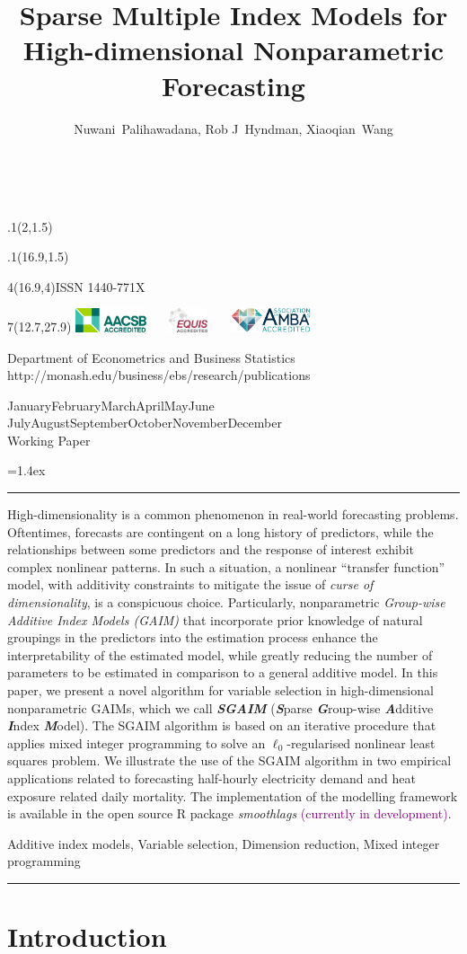 \documentclass[11pt,a4paper,]{article}
\title{Sparse Multiple Index Models for High-dimensional Nonparametric
Forecasting}
\author{Nuwani~Palihawadana, Rob J~Hyndman, Xiaoqian~Wang}
\date{\sf\Date~\Month~\Year}
\makeatletter
\def\Date{\number\day}
\def\Month{\ifcase\month\or
 January\or February\or March\or April\or May\or June\or
 July\or August\or September\or October\or November\or December\fi}
\def\Year{\number\year}
\def\showjel{{\large\textsf{\textbf{JEL classification:}}~\@jel}}
\def\cover{{\sffamily\setcounter{page}{0}
        \thispagestyle{empty}
        \placefig{2}{1.5}{width=5cm}{_extensions/numbats/wp/monash2}
        \placefig{16.9}{1.5}{width=2.1cm}{_extensions/numbats/wp/MBSportrait}
        \begin{textblock}{4}(16.9,4)ISSN 1440-771X\end{textblock}
        \begin{textblock}{7}(12.7,27.9)\hfill
        \includegraphics[height=0.7cm]{_extensions/numbats/wp/AACSB}~~~
        \includegraphics[height=0.7cm]{_extensions/numbats/wp/EQUIS}~~~
        \includegraphics[height=0.7cm]{_extensions/numbats/wp/AMBA}
        \end{textblock}
        \vspace*{2cm}
        \begin{center}\Large
        Department of Econometrics and Business Statistics\\[.5cm]
        \footnotesize http://monash.edu/business/ebs/research/publications
        \end{center}\vspace{2cm}
        \begin{center}
        \fbox{\parbox{14cm}{\begin{onehalfspace}\centering\Huge\vspace*{0.3cm}
                \textsf{\textbf{\expandafter{\@title}}}\vspace{1cm}\par
                \LARGE\@author\end{onehalfspace}
        }}
        \end{center}
        \vfill
                \begin{center}\Large
                \Month~\Year\\[1cm]
                Working Paper \@wp
        \end{center}\vspace*{2cm}}}
\def\pageone{{\sffamily\setstretch{1}%
        \thispagestyle{empty}%
        \vbox to \textheight{%
        \raggedright\baselineskip=1.2cm
     {\fontsize{24.88}{30}\sffamily\textbf{\expandafter{\@title}}}
        \vspace{2cm}\par
        \hspace{1cm}\parbox{14cm}{\sffamily\large\@addresses}\vspace{1cm}\vfill
        \hspace{1cm}{\large\Date~\Month~\Year}\\[1cm]
        \hspace{1cm}\showjel\vss}}}
\def\blindtitle{{\sffamily
     \thispagestyle{plain}\raggedright\baselineskip=1.2cm
     {\fontsize{24.88}{30}\sffamily\textbf{\expandafter{\@title}}}\vspace{1cm}\par
        }}
\def\titlepage{{\cover\newpage\pageone\newpage\blindtitle}}
\let\maketitle\titlepage
\newenvironment{keywords}{\par\vspace{0.5cm}\noindent{\sffamily\textbf{Keywords:}}}{\vspace{0.25cm}\par\hrule\vspace{0.5cm}\par}
\renewenvironment{abstract}{\begin{minipage}{\textwidth}\parskip=1.4ex\noindent
\hrule\vspace{0.1cm}\par{\sffamily\textbf{\abstractname}}\newline}
  {\end{minipage}}
\def\placefig#1#2#3#4{\begin{textblock}{.1}(#1,#2)\rlap{\texttt{[image: \#4]}}\end{textblock}}
\makeatother
\begin{document}
\maketitle
\begin{abstract}
High-dimensionality is a common phenomenon in real-world forecasting
problems. Oftentimes, forecasts are contingent on a long history of
predictors, while the relationships between some predictors and the
response of interest exhibit complex nonlinear patterns. In such a
situation, a nonlinear ``transfer function'' model, with additivity
constraints to mitigate the issue of \emph{curse of dimensionality}, is
a conspicuous choice. Particularly, nonparametric \emph{Group-wise
Additive Index Models (GAIM)} that incorporate prior knowledge of
natural groupings in the predictors into the estimation process enhance
the interpretability of the estimated model, while greatly reducing the
number of parameters to be estimated in comparison to a general additive
model. In this paper, we present a novel algorithm for variable
selection in high-dimensional nonparametric GAIMs, which we call
\textbf{\emph{SGAIM}} (\textbf{\emph{S}}parse \textbf{\emph{G}}roup-wise
\textbf{\emph{A}}dditive \textbf{\emph{I}}ndex \textbf{\emph{M}}odel).
The SGAIM algorithm is based on an iterative procedure that applies
mixed integer programming to solve an \(\ell_{0}\)-regularised nonlinear
least squares problem. We illustrate the use of the SGAIM algorithm in
two empirical applications related to forecasting half-hourly
electricity demand and heat exposure related daily mortality. The
implementation of the modelling framework is available in the open
source R package \emph{smoothlags}
\textcolor{purple}{(currently in development)}.
\end{abstract}
\begin{keywords}
Additive index models, Variable selection, Dimension reduction, Mixed
integer programming
\end{keywords}

\ifdefined\Shaded\renewenvironment{Shaded}{\begin{tcolorbox}[interior hidden, breakable, enhanced, borderline west={3pt}{0pt}{shadecolor}, sharp corners, frame hidden, boxrule=0pt]}{\end{tcolorbox}}\fi

\hypertarget{sec-introduction}{%
\section{Introduction}\label{sec-introduction}}
\end{document}
